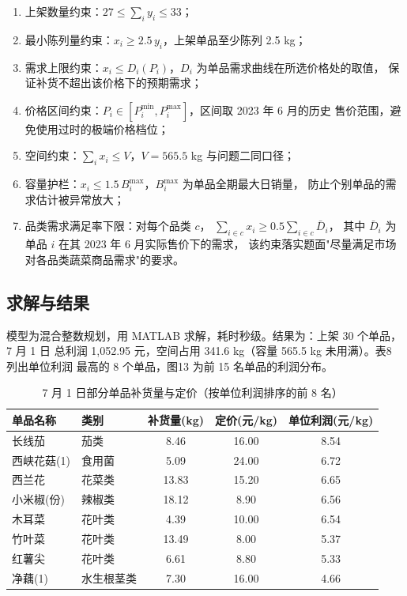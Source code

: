 \begin{enumerate}[label=（\arabic*）]
\item 上架数量约束：$27\le\sum_i y_i\le33$；
\item 最小陈列量约束：$x_i\ge 2.5\,y_i$，上架单品至少陈列 2.5 kg；
\item 需求上限约束：$x_i\le D_i(P_i)$，$D_i$ 为单品需求曲线在所选价格处的取值，
      保证补货不超出该价格下的预期需求；
\item 价格区间约束：$P_i\in[P_i^{\min},P_i^{\max}]$，区间取 2023 年 6 月的历史
      售价范围，避免使用过时的极端价格档位；
\item 空间约束：$\sum_i x_i\le V$，$V=565.5$ kg 与问题二同口径；
\item 容量护栏：$x_i\le 1.5\,B_i^{\max}$，$B_i^{\max}$ 为单品全期最大日销量，
      防止个别单品的需求估计被异常放大；
\item 品类需求满足率下限：对每个品类 $c$，
      $\sum_{i\in c}x_i\ge 0.5\sum_{i\in c}\bar D_i$，
      其中 $\bar D_i$ 为单品 $i$ 在其 2023 年 6 月实际售价下的需求，
      该约束落实题面"尽量满足市场对各品类蔬菜商品需求"的要求。
\end{enumerate}

\subsection{求解与结果}

模型为混合整数规划，用 MATLAB 求解，耗时秒级。结果为：上架 30 个单品，7 月 1 日
总利润 1,052.95 元，空间占用 341.6 kg（容量 565.5 kg 未用满）。表8 列出单位利润
最高的 8 个单品，图13 为前 15 名单品的利润分布。

\begin{table}[H]
\centering
\caption{7 月 1 日部分单品补货量与定价（按单位利润排序的前 8 名）}
\label{tab:q3items}
\small
\begin{tabular}{llccc}
\toprule
单品名称 & 类别 & 补货量(kg) & 定价(元/kg) & 单位利润(元/kg) \\
\midrule
长线茄 & 茄类 & 8.46 & 16.00 & 8.54 \\
西峡花菇(1) & 食用菌 & 5.09 & 24.00 & 6.72 \\
西兰花 & 花菜类 & 13.83 & 15.20 & 6.65 \\
小米椒(份) & 辣椒类 & 18.12 & 8.90 & 6.56 \\
木耳菜 & 花叶类 & 4.39 & 10.00 & 6.54 \\
竹叶菜 & 花叶类 & 13.49 & 8.00 & 5.37 \\
红薯尖 & 花叶类 & 6.61 & 8.80 & 5.33 \\
净藕(1) & 水生根茎类 & 7.30 & 16.00 & 4.66 \\
\bottomrule
\end{tabular}
\end{table}

